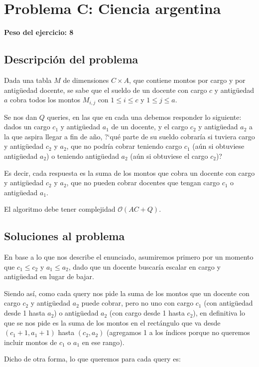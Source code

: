 \newpage{}
\section{Problema C: Ciencia argentina}
\textbf{Peso del ejercicio: 8}
\subsection{Descripción del problema}
Dada una tabla $M$ de dimensiones $C \times A$, que contiene montos por 
cargo y por antigüedad docente, se sabe que el sueldo de un docente 
con cargo $c$ y antigüedad $a$ cobra todos los montos $M_{i,j}$ 
con $1 \leq i \leq c$ y $1 \leq j \leq a$. 

Se nos dan $Q$ queries, en las que en cada una debemos responder lo siguiente: 
dados un cargo $c_1$ y antigüedad $a_1$ de un docente, y el cargo $c_2$ y antigüedad $a_2$ a 
la que aspira llegar a fin de año, ?`qué parte de su sueldo cobraría si tuviera cargo y antigüedad 
$c_2$ y $a_2$, que no podría cobrar teniendo cargo $c_1$ (aún si obtuviese antigüedad $a_2$) o teniendo 
antigüedad $a_2$ (aún si obtuviese el cargo $c_2$)?

Es decir, cada respuesta es la suma de los montos que cobra un docente con cargo y antigüedad 
$c_2$ y $a_2$, que no pueden cobrar docentes que tengan cargo $c_1$ o antigüedad $a_1$.

El algoritmo debe tener complejidad $\mathcal{O}(AC + Q)$. 

\subsection{Soluciones al problema}

En base a lo que nos describe el enunciado, asumiremos primero por un momento 
que $c_1 \leq c_2$ y $a_1 \leq a_2$, dado que un docente buscaría escalar en 
cargo y antigüedad en lugar de bajar. 

Siendo así, como cada query nos pide 
la suma de los montos que un docente con cargo $c_2$ y antigüedad $a_2$ puede cobrar, 
pero no uno con cargo $c_1$ (con antigüedad desde 1 hasta $a_2$) o 
antigüedad $a_2$ (con cargo desde 1 hasta $c_2$), en definitiva lo que se nos pide 
es la suma de los montos en el rectángulo que va desde $(c_1+1,a_1+1)$ hasta $(c_2, a_2)$ 
(agregamos 1 a los índices porque no queremos incluir montos de $c_1$ o $a_1$ en ese rango). 

Dicho de otra forma, lo que queremos para cada query es: 

